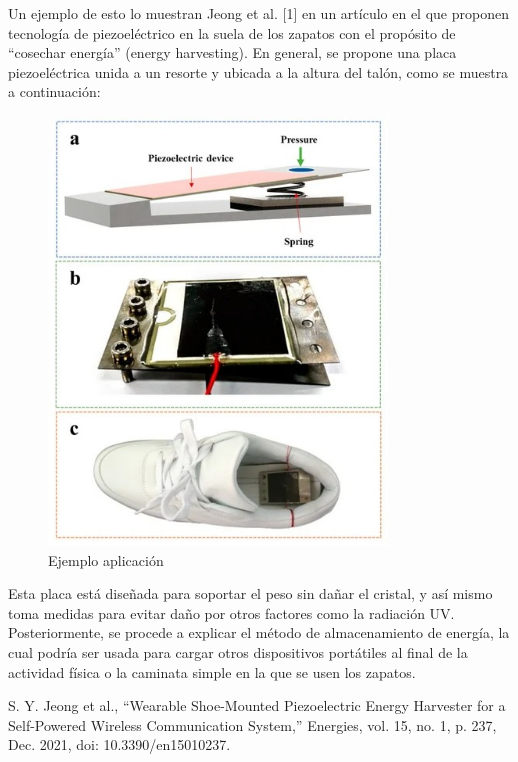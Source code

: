 \documentclass[journal,transmag]{IEEEtran}
\begin{document}
Un ejemplo de esto lo muestran Jeong et al. [1] en un artículo en el que proponen tecnología de piezoeléctrico en la suela de los zapatos con el propósito de “cosechar energía” (energy harvesting). En general, se propone una placa piezoeléctrica unida a un resorte y ubicada a la altura del talón, como se muestra a continuación: 

\begin{figure}[!h]
    \center
    \includegraphics[width=9cm]{imgs/s6.jpeg}
    \caption{Ejemplo aplicación}
    \label{2}
\end{figure}

Esta placa está diseñada para soportar el peso sin dañar el cristal, y así mismo toma medidas para evitar daño por otros factores como la radiación UV. Posteriormente, se procede a explicar el método de almacenamiento de energía, la cual podría ser usada para cargar otros dispositivos portátiles al final de la actividad física o la caminata simple en la que se usen los zapatos. 

\appendices


\ifCLASSOPTIONcaptionsoff
  \newpage
\fi


\begin{thebibliography}{1}


   S. Y. Jeong et al., “Wearable Shoe-Mounted Piezoelectric Energy Harvester for a Self-Powered Wireless Communication System,” Energies, vol. 15, no. 1, p. 237, Dec. 2021, doi: 10.3390/en15010237. 

\end{thebibliography}
\end{document}
